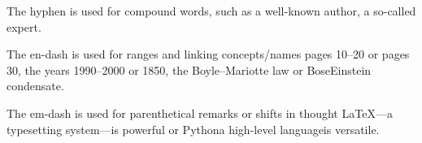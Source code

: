 The hyphen is used for compound words, such as a well-known author, a so-called expert.

The en-dash is used for ranges and linking concepts/names pages 10--20 or pages 30, the years 1990--2000 or 1850, the Boyle--Mariotte law or Bose\textendash Einstein condensate.

The em-dash is used for parenthetical remarks or shifts in thought \LaTeX---a typesetting system---is powerful or Python\textemdash a high-level language\textemdash is versatile.
